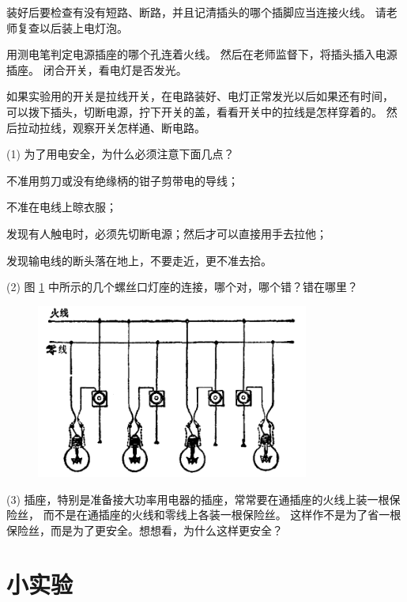 装好后要检查有没有短路、断路，并且记清插头的哪个插脚应当连接火线。
请老师复查以后装上电灯泡。

用测电笔判定电源插座的哪个孔连着火线。
然后在老师监督下，将插头插入电源插座。
闭合开关，看电灯是否发光。

如果实验用的开关是拉线开关，在电路装好、电灯正常发光以后如果还有时间，
可以拨下插头，切断电源，拧下开关的盖，看看开关中的拉线是怎样穿着的。
然后拉动拉线，观察开关怎样通、断电路。



\lianxi

(1) 为了用电安全，为什么必须注意下面几点？

 不准用剪刀或没有绝缘柄的钳子剪带电的导线；

 不准在电线上晾衣服；

 发现有人触电时，必须先切断电源；然后才可以直接用手去拉他；

 发现输电线的断头落在地上，不要走近，更不准去拾。

(2) 图 \ref{fig:11-12} 中所示的几个螺丝口灯座的连接，哪个对，哪个错？错在哪里？

\begin{figure}[H]%
    \centering
    \includegraphics[width=0.8\textwidth]{../pic/czwl2-ch11-12}
    \caption{}\label{fig:11-12}
\end{figure}

(3) 插座，特别是准备接大功率用电器的插座，常常要在通插座的火线上装一根保险丝，
而不是在通插座的火线和零线上各装一根保险丝。
这样作不是为了省一根保险丝，而是为了更安全。想想看，为什么这样更安全？



\section*{小实验}

